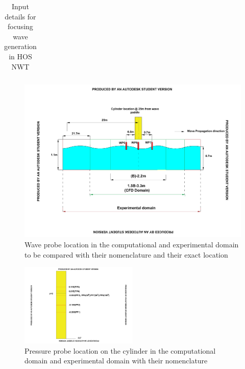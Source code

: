 \documentclass[preprint,12pt]{article}
\begin{document}
{\begin{table}[]
\begin{tabular}{l|c}
\end{tabular}

\caption{Input details for focusing wave generation in HOS NWT}
\label{tab:HOS_input}
\end{table}

\begin{figure} []
    \centering
    \includegraphics[width=\textwidth,height=0.4\textheight]{Wave_probe_location_cropped.pdf}
    \caption{Wave probe location in the computational and experimental domain to be compared with their nomenclature and their exact location}
    \label{fig:WP_location}
\end{figure}
\begin{figure} []
    \centering
    \includegraphics[width=0.5\textwidth,height=0.4\textheight]{Pressure_probe_location_cropped.pdf}
    \caption{Pressure probe location on the cylinder in the computational domain and experimental domain with their nomenclature}
    \label{fig:PP_location}
\end{figure}

}
\end{document}
